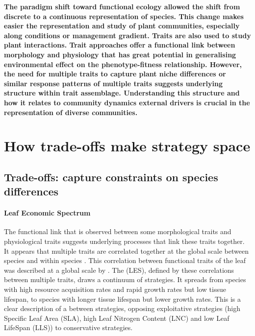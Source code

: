 \textbf{The paradigm shift toward functional ecology allowed the shift from discrete to a continuous representation of species. This change makes easier the representation and study of plant communities, especially along conditions or management gradient. Traits are also used to study plant interactions.  Trait approaches offer a functional link between morphology and physiology that has great potential in generalising environmental effect on the phenotype-fitness relationship. However, the need for multiple traits to capture plant niche differences or similar response patterns of multiple traits suggests underlying structure within trait assemblage. Understanding this structure and how it relates to community dynamics external drivers is crucial in the representation of diverse communities. } 





\section{How trade-offs make strategy space}

\subsection{Trade-offs: capture constraints on species differences}

\paragraph{Leaf Economic Spectrum}
The functional link that is observed between some morphological traits and physiological traits suggests underlying processes that link these traits together. It appears that multiple traits are correlated together at the global scale between species \parencite{reich_evolution_2003,     wright_worldwide_2004, chave_towards_2009, reich_world-wide_2014} and within species \parencite{hu_novel_2015}. This correlation between functional traits of the leaf was described at a global scale by \cite{wright_worldwide_2004}. The  (LES), defined by these correlations between multiple traits, draws a continuum of strategies. It spreads from species with high resource acquisition rates and rapid growth rates but low tissue lifespan, to species with longer tissue lifespan but lower growth rates. This is a clear description of a  between strategies, opposing exploitative strategies (high Specific Leaf Area (SLA), high Leaf Nitrogen Content (LNC) and low Leaf LifeSpan (LLS)) to conservative strategies.


